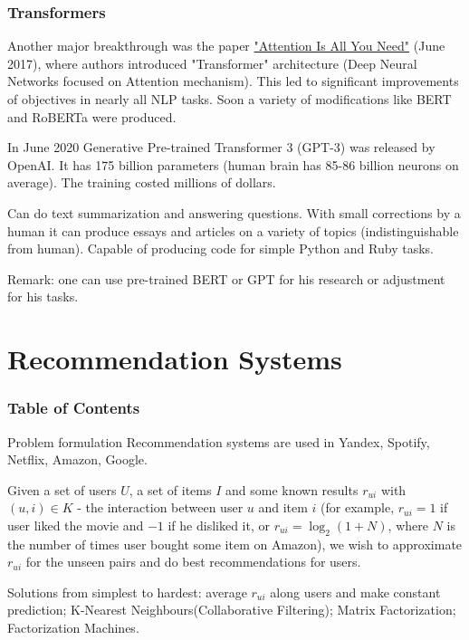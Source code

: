 \documentclass{beamer}
\theoremstyle{remark}
\begin{document}
\begin{frame}
    \frametitle{Transformers}
    Another major breakthrough was the paper \href{https://arxiv.org/abs/1706.03762}{"Attention Is All You Need"} (June 2017), where authors introduced "Transformer" architecture (Deep Neural Networks focused on Attention mechanism). This led to significant improvements of objectives in nearly all NLP tasks. Soon a variety of modifications like BERT and RoBERTa were produced.\vspace{0.1in}
    
    In June 2020 Generative Pre-trained Transformer 3 (GPT-3) was released by OpenAI. It has 175 billion parameters (human brain has 85-86 billion neurons on average). The training costed millions of dollars.\vspace{0.1in}
    
    Can do text summarization and answering questions. With small corrections by a human it can produce essays and articles on a variety of topics (indistinguishable from human). Capable of producing code for simple Python and Ruby tasks.\vspace{0.1in}
    
    Remark: one can use pre-trained BERT or GPT for his research or adjustment for his tasks.
\end{frame}

\section{Recommendation Systems}

\begin{frame}
    \frametitle{Table of Contents}
    \tableofcontents[currentsection]
\end{frame}

\begin{frame}{Problem formulation}
    Recommendation systems are used in Yandex, Spotify, Netflix, Amazon, Google.\vspace{0.1in}
    
    Given a set of users $U$, a set of items $I$ and some known results $r_{ui}$ with $(u,i) \in K$ - the interaction between user $u$ and item $i$ (for example, $r_{ui} = 1$ if user liked the movie and $-1$ if he disliked it, or $r_{ui} = \log_{2}(1 + N)$, where $N$ is the number of times user bought some item on Amazon), we wish to approximate $r_{ui}$ for the unseen pairs and do best recommendations for users.\vspace{0.1in}
    
    Solutions from simplest to hardest: average $r_{ui}$ along users and make constant prediction; K-Nearest Neighbours(Collaborative Filtering); Matrix Factorization; Factorization Machines.
\end{frame}
\end{document}
